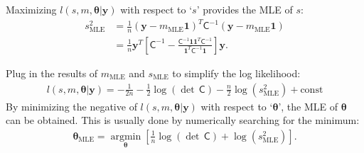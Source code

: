 \documentclass[smallextended]{svjour3}       %
\newcommand{\bm}[1]{\boldsymbol{#1}}
\newcommand{\vtheta}{{\bm{\theta}}}
\newcommand{\vy}{\bm{y}}
\newcommand{\vone}{\bm{1}}
\newcommand{\mC}{\mathsf{C}}
\newcommand{\mCInv}{{\mathsf{C}^{-1}}}
\newcommand{\MLE}{\text{MLE}}
\providecommand{\argmin}{\operatorname*{argmin}}
\begin{document}
Maximizing $l(s,m,\vtheta | \vy)$ with respect to `$s$' provides the MLE of $s$:
\begin{align}
\label{eqn_s2_MLE}
\nonumber
s^2_{\MLE}  
&= \frac{1}{n} (\vy-m_{\MLE}\vone)^T\mCInv(\vy-m_{\MLE}\vone) 
\\
&= 
\frac{1}{n}
\vy^T 
\left[ 
\mCInv - 
\frac{ \mCInv \vone \vone^T \mCInv }{\vone^T\mCInv \vone}
\right] \vy.
\end{align}

Plug in the results of $m_\MLE$ and $s_\MLE$ to simplify the log likelihood:
\begin{align*}
l(s,m,\vtheta | \vy) 
= -\frac{1}{2n}  - \frac{1}{2} \log(\det\,\mC) - \frac{n}{2} \log(s^2_\MLE) + \text{const}
\end{align*}
By minimizing the negative of $l(s,m,\vtheta | \vy) $ with respect to `$\vtheta$', the MLE of $\vtheta$ can be obtained. This is usually done by numerically searching for the minimum:
\begin{align}
\label{eqn:thetaMLE}
\vtheta_\MLE
= 
\argmin_{\vtheta}
\left[
 \frac{1}{n} \log(\det\, \mC) + 
 \log\left(s^2_\MLE \right) 
\right].
\end{align}
\end{document}
